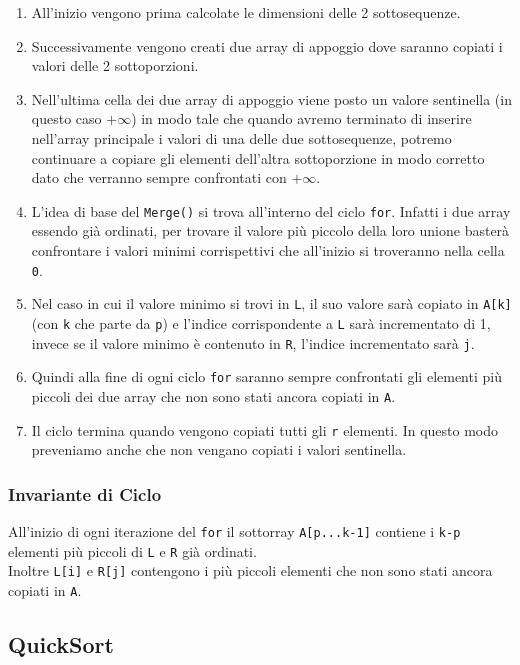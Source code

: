 \documentclass{article}
\begin{document}
\begin{enumerate}
    \item All'inizio vengono prima calcolate le dimensioni delle 2 sottosequenze.
    \item Successivamente vengono creati due array di appoggio dove saranno copiati i valori delle 2 sottoporzioni.
    \item Nell'ultima cella dei due array di appoggio viene posto un valore sentinella (in questo caso $+ \infty$) in modo tale che quando avremo terminato di inserire nell'array principale i valori di una delle due sottosequenze, potremo continuare a copiare gli elementi dell'altra sottoporzione in modo corretto dato che verranno sempre confrontati con $+ \infty$.
    \item L'idea di base del \verb|Merge()| si trova all'interno del ciclo \verb|for|. Infatti i due array essendo già ordinati, per trovare il valore più piccolo della loro unione basterà confrontare i valori minimi corrispettivi che all'inizio si troveranno nella cella \verb|0|.
    \item Nel caso in cui il valore minimo si trovi in \verb|L|, il suo valore sarà copiato in \verb|A[k]| (con \verb|k| che parte da \verb|p|) e l'indice corrispondente a \verb|L| sarà incrementato di 1, invece se il valore minimo è contenuto in \verb|R|, l'indice incrementato sarà \verb|j|.
    \item Quindi alla fine di ogni ciclo \verb|for| saranno sempre confrontati gli elementi più piccoli dei due array che non sono stati ancora copiati in \verb|A|.
    \item Il ciclo termina quando vengono copiati tutti gli \verb|r| elementi. In questo modo preveniamo anche che non vengano copiati i valori sentinella.
\end{enumerate}

\subsubsection{Invariante di Ciclo}

All'inizio di ogni iterazione del \verb|for| il sottorray \verb|A[p...k-1]| contiene i \verb|k-p| elementi più piccoli di \verb|L| e \verb|R| già ordinati. \\
Inoltre \verb|L[i]| e \verb|R[j]| contengono i più piccoli elementi che non sono stati ancora copiati in \verb|A|. 



\subsection{QuickSort}
\end{document}
